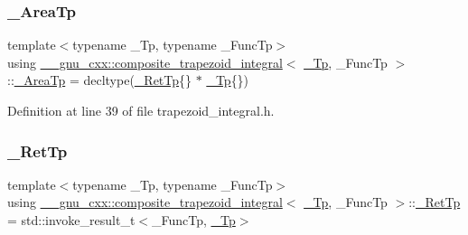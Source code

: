 \subsubsection{\texorpdfstring{\+\_\+\+Area\+Tp}{\_AreaTp}}
{\footnotesize\ttfamily template$<$typename \+\_\+\+Tp, typename \+\_\+\+Func\+Tp$>$ \\
using \hyperlink{class____gnu__cxx_1_1composite__trapezoid__integral}{\+\_\+\+\_\+gnu\+\_\+cxx\+::composite\+\_\+trapezoid\+\_\+integral}$<$ \hyperlink{namespace____gnu__cxx_a3b19a9c800ca194374ef9172290f7d79}{\+\_\+\+Tp}, \+\_\+\+Func\+Tp $>$\+::\hyperlink{class____gnu__cxx_1_1composite__trapezoid__integral_a0839ba042e2636869679bbf343b2a930}{\+\_\+\+Area\+Tp} =  decltype(\hyperlink{class____gnu__cxx_1_1composite__trapezoid__integral_af223f0ed55e750221cb3114c6f2fcb60}{\+\_\+\+Ret\+Tp}\{\} $\ast$ \hyperlink{namespace____gnu__cxx_a3b19a9c800ca194374ef9172290f7d79}{\+\_\+\+Tp}\{\})}



Definition at line 39 of file trapezoid\+\_\+integral.\+h.

\mbox{\label{class____gnu__cxx_1_1composite__trapezoid__integral_af223f0ed55e750221cb3114c6f2fcb60}} 
\subsubsection{\texorpdfstring{\+\_\+\+Ret\+Tp}{\_RetTp}}
{\footnotesize\ttfamily template$<$typename \+\_\+\+Tp, typename \+\_\+\+Func\+Tp$>$ \\
using \hyperlink{class____gnu__cxx_1_1composite__trapezoid__integral}{\+\_\+\+\_\+gnu\+\_\+cxx\+::composite\+\_\+trapezoid\+\_\+integral}$<$ \hyperlink{namespace____gnu__cxx_a3b19a9c800ca194374ef9172290f7d79}{\+\_\+\+Tp}, \+\_\+\+Func\+Tp $>$\+::\hyperlink{class____gnu__cxx_1_1composite__trapezoid__integral_af223f0ed55e750221cb3114c6f2fcb60}{\+\_\+\+Ret\+Tp} =  std\+::invoke\+\_\+result\+\_\+t$<$\+\_\+\+Func\+Tp, \hyperlink{namespace____gnu__cxx_a3b19a9c800ca194374ef9172290f7d79}{\+\_\+\+Tp}$>$}



